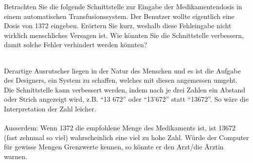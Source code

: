 \begin{exercise}
  Betrachten Sie die folgende Schnittstelle zur Eingabe der Medikamentendosis in einem automatischen Transfusionssystem.
  Der Benutzer wollte eigentlich eine Dosis von 1372 eingeben. 
  Erörtern Sie kurz, 
  weshalb diese Fehleingabe nicht wirklich menschliches Versagen ist. 
  Wie könnten Sie die Schnittstelle verbessern, damit solche Fehler verhindert werden könnten?
  \\\\
\end{exercise}
Derartige Ausrutscher liegen in der Natur des Menschen und es ist die Aufgabe des Designers, 
ein System zu schaffen, welches mit diesen angemessen umgeht.
Die Schnittstelle kann verbessert werden, 
indem nach je drei Zahlen ein Abstand oder Strich angezeigt wird, z.B. \enquote{13 672} oder \enquote{13'672} statt \enquote{13672}.
So wäre die Interpretation der Zahl leicher.\\\\
Ausserdem: Wenn 1372 die empfohlene Menge des Medikaments ist, ist 13672 (fast zehnmal so viel) wahrscheinlich eine viel zu hohe Zahl.
Würde der Computer für gewisse Mengen Grenzwerte kennen, so könnte er den Arzt/die Ärztin warnen.